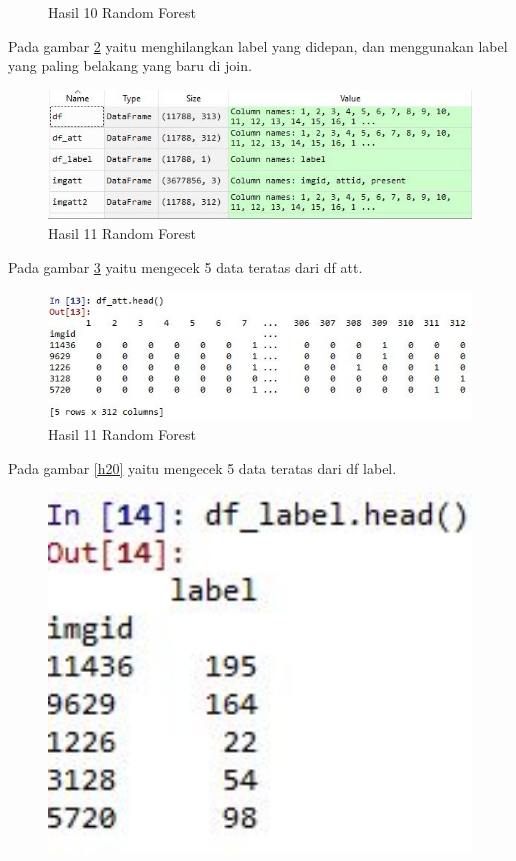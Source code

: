 \begin{enumerate}
\begin{figure}[!htbp]
	\caption{Hasil 10 Random Forest}
	\label{h17}
\end{figure}
\subitem Pada gambar \ref{h18} yaitu menghilangkan label yang didepan, dan menggunakan label yang paling belakang yang baru di join.
\begin{figure}[!htbp]
	\centerline{\includegraphics[width=1\textwidth]{figures/huda/chapter3_praktek/14.JPG}}
	\caption{Hasil 11 Random Forest}
	\label{h18}
\end{figure}
\subitem Pada gambar \ref{h19} yaitu mengecek 5 data teratas dari df att.
\begin{figure}[!htbp]
	\centerline{\includegraphics[width=1\textwidth]{figures/huda/chapter3_praktek/15.JPG}}
	\caption{Hasil 11 Random Forest}
	\label{h19}
\end{figure}
\subitem Pada gambar \ref{h20} yaitu mengecek 5 data teratas dari df label.
\begin{figure}[!htbp]
	\centerline{\includegraphics[width=1\textwidth]{figures/huda/chapter3_praktek/16.JPG}}

\end{figure}
\end{enumerate}
